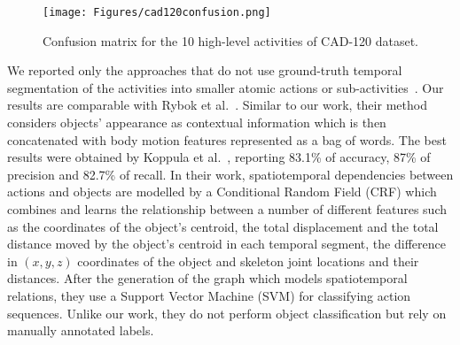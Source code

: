 \documentclass[5p,times]{elsarticle}
\begin{document}
\begin{figure}
\begin{center}
\texttt{[image: Figures/cad120confusion.png]}
\end{center}
\caption{Confusion matrix for the 10 high-level activities of CAD-120 dataset.}
\label{fig:conf_cad}
\end{figure}

We reported only the approaches that do not use ground-truth temporal segmentation of the activities into smaller atomic actions or sub-activities~\cite{hu2014learning, taha2015skeleton}.
Our results are comparable with Rybok et al.~\cite{rybok2014important}.
Similar to our work, their method considers objects' appearance as contextual information which is then concatenated with body motion features represented as a bag of words. 
The best results were obtained by Koppula et al.~\cite{koppula2013l}, reporting 83.1\% of accuracy, 87\% of precision and 82.7\% of recall.
In their work, spatiotemporal dependencies between actions and objects are modelled by a Conditional Random Field (CRF) which combines and learns the relationship between a number of different features such as the coordinates of the object's centroid, the total displacement and the total distance moved by the object's centroid in each temporal segment, the difference in $(x, y, z)$ coordinates of the object and skeleton joint locations and their distances.
After the generation of the graph which models spatiotemporal relations, they use a Support Vector Machine (SVM) for classifying action sequences. 
Unlike our work, they do not perform object classification but rely on manually annotated labels.
\end{document}
